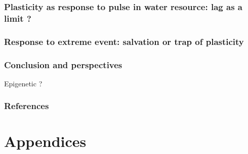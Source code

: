 \documentclass[review]{elsarticle}
\begin{document}
\section{Plasticity as response to pulse in water resource: lag as a limit ?}

\section{Response to extreme event: salvation or trap of plasticity}


\section{Conclusion and perspectives}

Epigenetic ?


\section*{References}
\cite{Dirac1953888}


\part*{Appendices}
\end{document}
